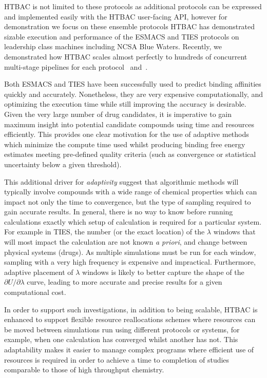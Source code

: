 \documentclass[conference]{IEEEtran}
\begin{document}
HTBAC is not limited to these protocols as additional protocols can be 
expressed and implemented easily with the HTBAC user-facing API, however for 
demonstration we focus on these ensemble protocols HTBAC has demonstrated 
sizable execution and performance of the ESMACS and TIES protocols on leadership
class machines including NCSA Blue Waters. Recently, we demonstrated how HTBAC 
scales almost perfectly to hundreds of concurrent multi-stage pipelines for each
protocol~\cite{dakka2017} and~\cite{dakka_farkaspall}. 

Both ESMACS and TIES have been successfully used to predict binding affinities
quickly and accurately. Nonetheless, they are very expensive computationally,
and optimizing the execution time while still improving the accuracy is
desirable. Given the very large number of drug candidates, it is imperative to
gain maximum insight into potential candidate compounds using time and
resources efficiently. This provides one clear motivation for the use of
adaptive methods which minimize the compute time used whilst producing binding
free energy estimates meeting pre-defined quality criteria (such as
convergence or statistical uncertainty below a given threshold).

This additional driver for \textit{adaptivity} suggest that algorithmic methods will
typically involve compounds with a wide range of chemical properties which can
impact not only the time to convergence, but the type of sampling required to
gain accurate results. In general, there is no way to know before running
calculations exactly which setup of calculation is required for a particular
system. For example in TIES, the number (or the exact location) of the
$\lambda$ windows that will most impact the calculation are not known
\textit{a priori}, and change between physical systems (drugs). As multiple
simulations must be run for each window, sampling with a very high frequency
is expensive and impractical. Furthermore, adaptive placement of $\lambda$
windows is likely to better capture the shape of the 
$\partial U/\partial\lambda$ curve, leading to more accurate and precise 
results for a given computational cost.

In order to support such
investigations, in addition to being scalable, HTBAC is enhanced to
support flexible resource reallocations schemes where resources can be moved
between simulations run using different protocols or systems, for example,
when one calculation has converged whilst another has not. This adaptability
makes it easier to manage complex programs where efficient use of resources
is required in order to achieve a time to completion of studies comparable to
those of high throughput chemistry. 
\end{document}
